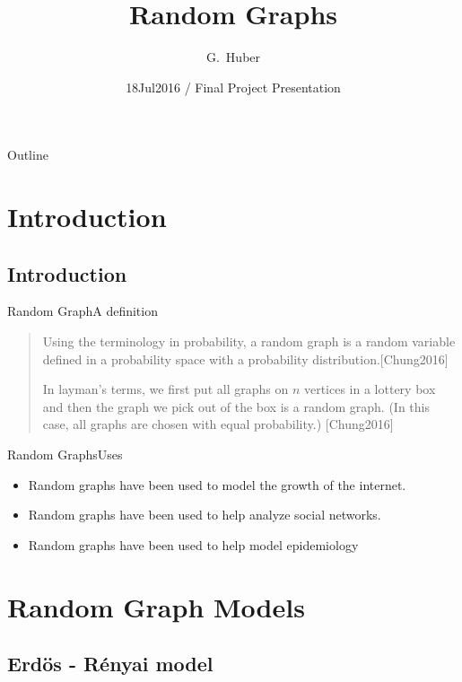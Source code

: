 \documentclass{beamer}
\title[Random Graphs]  
{Random Graphs}
\author[Huber] {G.~Huber}
\date[Short Occasion] {18Jul2016 / Final Project Presentation}
\begin{document}
\begin{frame}
  \titlepage
\end{frame}

\begin{frame}{Outline}
  \tableofcontents
\end{frame}

\section{Introduction}

\subsection[Introduction]{Introduction}

\begin{frame}{Random Graph}{A definition}
\begin{quote}
Using the terminology in probability, a random graph is a random variable defined in a probability space
with a probability distribution.[Chung2016]
\par
\vspace{1.0cm}
In layman's terms, we  first put all graphs on $n$ vertices in a lottery box and then the graph we pick 
out of the box is a random graph. (In this case, all graphs are chosen with equal probability.) [Chung2016]
\end{quote}
\end{frame}

\begin{frame}{Random Graphs}{Uses}
\begin{itemize}
\item Random graphs have been used to model the growth of the internet.
\item Random graphs have been used to help analyze social networks.
\item Random graphs have been used to help model epidemiology 
 

\end{itemize}

\end{frame}

\section{Random Graph Models}
\subsection{Erd\"os - R\'enyai model}
\end{document}

